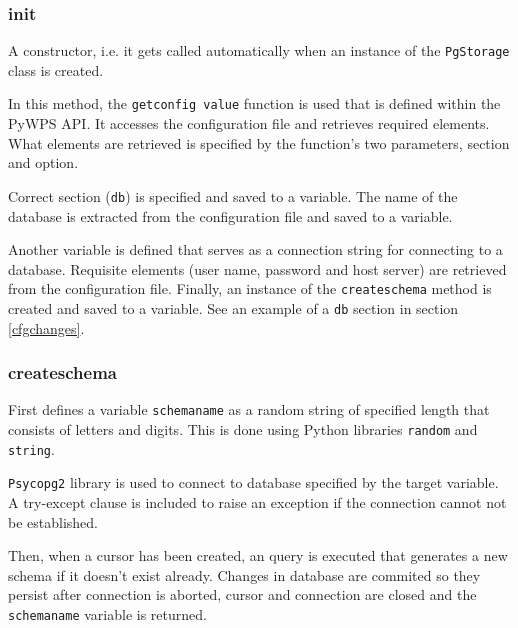 \subsubsection{\textunderscore \textunderscore init\textunderscore \textunderscore } 
A constructor, i.e. it gets called automatically when an instance of
the \texttt{PgStorage} class is created.

In this method, the \texttt{get\textunderscore config\textunderscore
  value} function is used that is defined within the PyWPS API. It
accesses the configuration file and retrieves required elements. What
elements are retrieved is specified by the function's two parameters,
section and option.

Correct section (\texttt{db}) is specified and saved to a
variable. The name of the database is extracted from the
configuration file and saved to a variable.

Another variable is defined that serves as a connection string for
connecting to a database. Requisite elements (user name, password and
host server) are retrieved from the configuration file. Finally, an
instance of the \texttt{\textunderscore create\textunderscore schema}
method is created and saved to a variable. See an example of a \texttt{db}
section in section \ref{cfgchanges}.


\subsubsection{\textunderscore create\textunderscore schema} 

First defines a variable \texttt{schema\textunderscore name} as a
random string of specified length that consists of letters and
digits. This is done using Python libraries \texttt{random} and
\texttt{string}.
 

\texttt{Psycopg2} library is used to connect to database
specified by the target variable. A try-except clause is included to raise
an exception if the connection cannot not be established.

Then, when a cursor has been created, an  query is executed
that generates a new schema if it doesn't exist already. Changes in database are
commited so they persist after connection is aborted, cursor and
connection are closed and the \texttt{schema\textunderscore name}
variable is returned.

